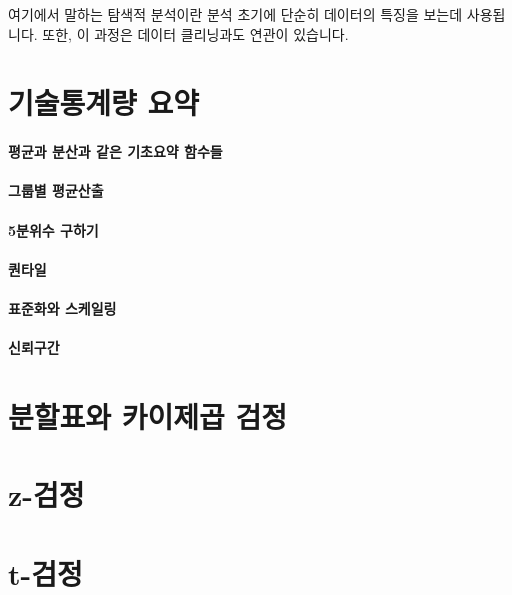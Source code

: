 \documentclass{report}
\begin{document}
여기에서 말하는 탐색적 분석이란 분석 초기에 단순히 데이터의 특징을 보는데 사용됩니다. 
또한, 이 과정은 데이터 클리닝과도 연관이 있습니다. 

\section{기술통계량 요약}

\paragraph{평균과 분산과 같은 기초요약 함수들}

\paragraph{그룹별 평균산출}

\paragraph{5분위수 구하기}

\paragraph{퀀타일}

\paragraph{표준화와 스케일링}

\paragraph{신뢰구간}

\section{분할표와 카이제곱 검정}

\section{z-검정}

\section{t-검정}

\section{}
\end{document}
